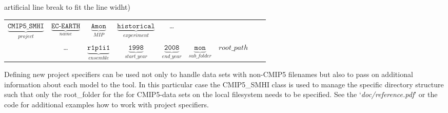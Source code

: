 \documentclass[12pt]{article}
\newcommand{\docref}[1]{`\emph{#1}'}
\begin{document}
artificial line break to fit the line widht) 
\small
\begin{center}
\begin{tabular}{c c c c c c c c c}
$\underbrace{\mathtt{CMIP5\_SMHI}}_{project}$ & %
$\underbrace{\mathtt{EC\text{-}EARTH}}_{name}$  & %
$\underbrace{\mathtt{Amon}}_{MIP}$      & %
$\underbrace{\mathtt{historical}}_{experiment}$ &  \ldots & & & %
\\
& \ldots & $\underbrace{\mathtt{r1p1i1}}_{ensemble}$    & %
$\underbrace{\mathtt{1998}}_{start\_year}$ & %
$\underbrace{\mathtt{2008}}_{end\_year}$ & %
$\underbrace{\mathtt{mon}}_{sub\_folder}$ & %
$root\_path$
\end{tabular}
\end{center}
\normalsize
Defining new project specifiers can be used not only to handle data
sets with non-CMIP5 filenames but also to pass on additional
information about each model to the tool. In this particular case the
CMIP5\_SMHI class is used to manage the specific directory structure
such that only the root\_folder for the for CMIP5-data sets on the
local filesystem needs to be specified. See the
\docref{doc/reference.pdf} or the code for additional examples how to
work with project specifiers. 

\end{document}
